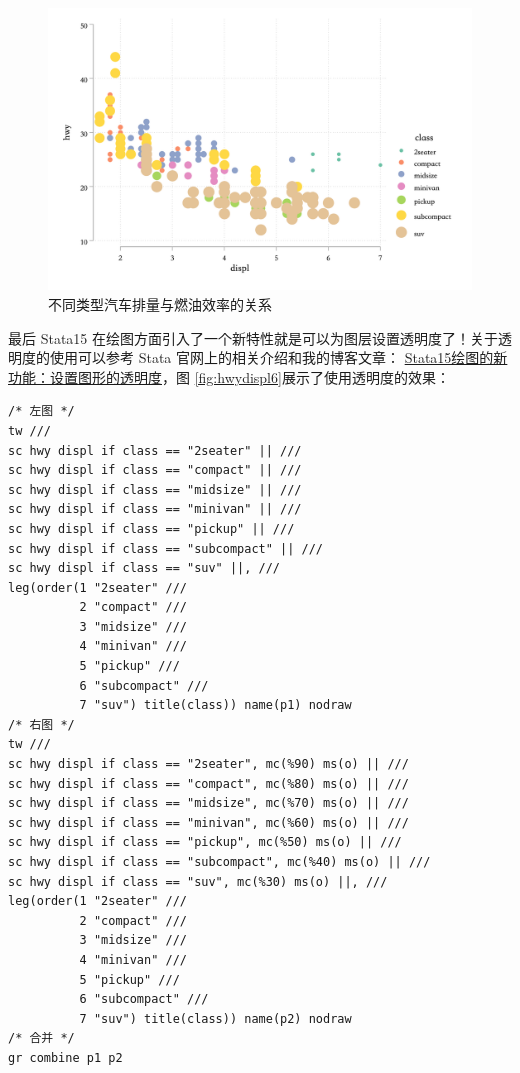 \begin{figure}[htbp]
  \centering
  \includegraphics[width=\textwidth]{assets/hwydispl5.png}
  \caption{不同类型汽车排量与燃油效率的关系}\label{fig:hwydispl5}
\end{figure}

最后 Stata15 在绘图方面引入了一个新特性就是可以为图层设置透明度了！关于透明度的使用可以参考 Stata 官网上的相关介绍和我的博客文章： \href{https://www.czxa.top/posts/44086/}{Stata15绘图的新功能：设置图形的透明度}，图 \ref{fig:hwydispl6}展示了使用透明度的效果：

\begin{lstlisting}
/* 左图 */
tw ///
sc hwy displ if class == "2seater" || ///
sc hwy displ if class == "compact" || ///
sc hwy displ if class == "midsize" || ///
sc hwy displ if class == "minivan" || ///
sc hwy displ if class == "pickup" || ///
sc hwy displ if class == "subcompact" || ///
sc hwy displ if class == "suv" ||, ///
leg(order(1 "2seater" ///
          2 "compact" ///
          3 "midsize" ///
          4 "minivan" ///
          5 "pickup" ///
          6 "subcompact" ///
          7 "suv") title(class)) name(p1) nodraw
/* 右图 */
tw ///
sc hwy displ if class == "2seater", mc(%90) ms(o) || ///
sc hwy displ if class == "compact", mc(%80) ms(o) || ///
sc hwy displ if class == "midsize", mc(%70) ms(o) || ///
sc hwy displ if class == "minivan", mc(%60) ms(o) || ///
sc hwy displ if class == "pickup", mc(%50) ms(o) || ///
sc hwy displ if class == "subcompact", mc(%40) ms(o) || ///
sc hwy displ if class == "suv", mc(%30) ms(o) ||, ///
leg(order(1 "2seater" ///
          2 "compact" ///
          3 "midsize" ///
          4 "minivan" ///
          5 "pickup" ///
          6 "subcompact" ///
          7 "suv") title(class)) name(p2) nodraw
/* 合并 */
gr combine p1 p2
\end{lstlisting}

